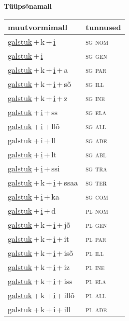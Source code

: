 
\vspace{1.8em}
\begin{minipage}{\textwidth}
\textbf{Tüüpsõnamall \,}\\

\begin{sideways}
\begin{tabular}{l l}
muutvormimall & tunnused \\
\hline
\underline{galstuk}\,+\,k\,+\,\underline{i} & \textsc{ sg nom } \\
\underline{galstuk}\,+\,\underline{i} & \textsc{ sg gen } \\
\underline{galstuk}\,+\,k\,+\,\underline{i}\,+\,a & \textsc{ sg par } \\
\underline{galstuk}\,+\,k\,+\,\underline{i}\,+\,sõ & \textsc{ sg ill } \\
\underline{galstuk}\,+\,k\,+\,\underline{i}\,+\,z & \textsc{ sg ine } \\
\underline{galstuk}\,+\,\underline{i}\,+\,ss & \textsc{ sg ela } \\
\underline{galstuk}\,+\,\underline{i}\,+\,llõ & \textsc{ sg all } \\
\underline{galstuk}\,+\,\underline{i}\,+\,ll & \textsc{ sg ade } \\
\underline{galstuk}\,+\,\underline{i}\,+\,lt & \textsc{ sg abl } \\
\underline{galstuk}\,+\,\underline{i}\,+\,ssi & \textsc{ sg tra } \\
\underline{galstuk}\,+\,k\,+\,\underline{i}\,+\,ssaa & \textsc{ sg ter } \\
\underline{galstuk}\,+\,\underline{i}\,+\,ka & \textsc{ sg com } \\
\underline{galstuk}\,+\,\underline{i}\,+\,d & \textsc{ pl nom } \\
\underline{galstuk}\,+\,k\,+\,\underline{i}\,+\,jõ & \textsc{ pl gen } \\
\underline{galstuk}\,+\,k\,+\,\underline{i}\,+\,it & \textsc{ pl par } \\
\underline{galstuk}\,+\,k\,+\,\underline{i}\,+\,isõ & \textsc{ pl ill } \\
\underline{galstuk}\,+\,k\,+\,\underline{i}\,+\,iz & \textsc{ pl ine } \\
\underline{galstuk}\,+\,k\,+\,\underline{i}\,+\,iss & \textsc{ pl ela } \\
\underline{galstuk}\,+\,k\,+\,\underline{i}\,+\,illõ & \textsc{ pl all } \\
\underline{galstuk}\,+\,k\,+\,\underline{i}\,+\,ill & \textsc{ pl ade } \\

\end{tabular}
\end{sideways}
\end{minipage}
